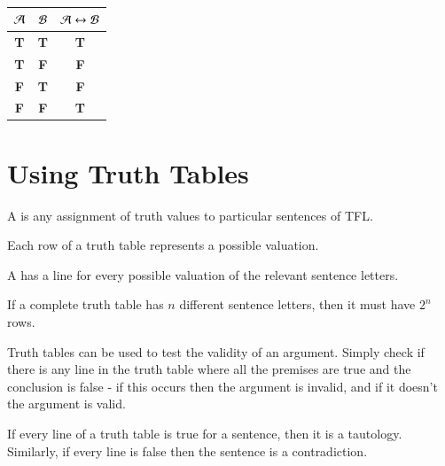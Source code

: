 \documentclass[12pt, a4paper, oneside, openright, titlepage]{book}
\begin{document}
\begin{table}[H]
    \centering
    \caption{}
    \begin{tabular}{cc|c}
        $\mathcal{A}$ & $\mathcal{B}$ & $\mathcal{A} \leftrightarrow \mathcal{B}$\\ \hline
        \textbf{T} & \textbf{T} & \textbf{T} \\
        \textbf{T} & \textbf{F} & \textbf{F} \\
        \textbf{F} & \textbf{T} & \textbf{F} \\
        \textbf{F} & \textbf{F} & \textbf{T}
    \end{tabular}
\end{table}

\section{\textsection Using Truth Tables}

\begin{defn}
    A  is any assignment of truth values to particular sentences of TFL.
\end{defn}

\begin{rmk}
    Each row of a truth table represents a possible valuation.
\end{rmk}

\begin{defn}
    A  has a line for every possible valuation of the relevant sentence letters.
\end{defn}


\begin{prop}
    If a complete truth table has $n$ different sentence letters, then it must have $2^n$ rows.
\end{prop}


\begin{rmk}
    Truth tables can be used to test the validity of an argument. Simply check if there is any line in the truth table where all the premises are true and the conclusion is false - if this occurs then the argument is invalid, and if it doesn't the argument is valid.
\end{rmk}

\begin{rmk}
    If every line of a truth table is true for a sentence, then it is a tautology. Similarly, if every line is false then the sentence is a contradiction.
\end{rmk}
\end{document}
